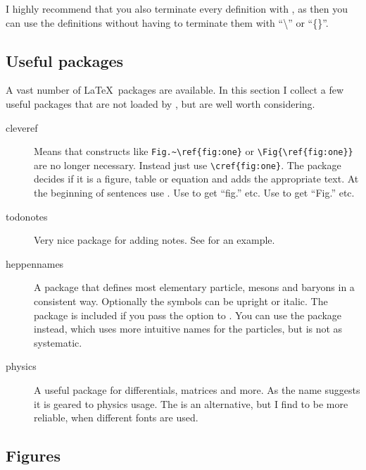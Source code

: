 I highly recommend that you also terminate every definition with ,
as then you can use the definitions without having to terminate them with
\enquote{\textbackslash\textvisiblespace} or \enquote{\{\}}.


\subsection{Useful packages}

A vast number of \LaTeX\ packages are available.
In this section I collect a few useful packages that are not loaded
by , but are well worth considering.

\begin{description}
  \item[cleveref] Means that constructs like \verb|Fig.~\ref{fig:one}| or
  \verb|\Fig{\ref{fig:one}}| are no longer necessary.
  Instead just use \verb|\cref{fig:one}|.
  The package decides if it is a figure, table or equation and
  adds the appropriate text.
  At the beginning of sentences use .
  Use  to get \enquote{fig.} etc.
  Use  to get \enquote{Fig.} etc.

  \item[todonotes] Very nice package for adding notes.
  See  for an example.

  \item[heppennames] A package that defines most elementary particle, mesons and baryons in a
  consistent way. Optionally the symbols can be upright or italic.
  The package is included if you pass the option  to .
  You can use the package  instead, which uses more intuitive names for the particles,
  but is not as systematic.

  \item[physics] A useful package for differentials, matrices and more.
  As the name suggests it is geared to physics usage.
  The  is an alternative, but I find  to be more reliable,
  when different fonts are used.
\end{description}


\subsection{Figures}

